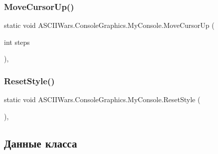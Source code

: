 \subsubsection{\texorpdfstring{Move\+Cursor\+Up()}{MoveCursorUp()}}
{\footnotesize\ttfamily static void A\+S\+C\+I\+I\+Wars.\+Console\+Graphics.\+My\+Console.\+Move\+Cursor\+Up (\begin{DoxyParamCaption}\item[{int}]{steps }\end{DoxyParamCaption})\hspace{0.3cm}{\ttfamily [inline]}, {\ttfamily [static]}}

\hypertarget{class_a_s_c_i_i_wars_1_1_console_graphics_1_1_my_console_aaf8beb7ac6983ccf63473d92398173a6}{}\label{class_a_s_c_i_i_wars_1_1_console_graphics_1_1_my_console_aaf8beb7ac6983ccf63473d92398173a6} 
\subsubsection{\texorpdfstring{Reset\+Style()}{ResetStyle()}}
{\footnotesize\ttfamily static void A\+S\+C\+I\+I\+Wars.\+Console\+Graphics.\+My\+Console.\+Reset\+Style (\begin{DoxyParamCaption}{ }\end{DoxyParamCaption})\hspace{0.3cm}{\ttfamily [inline]}, {\ttfamily [static]}}



\subsection{Данные класса}
\hypertarget{class_a_s_c_i_i_wars_1_1_console_graphics_1_1_my_console_a261e68f3fe9fa1ba12f21cb4e7a2e5f0}{}\label{class_a_s_c_i_i_wars_1_1_console_graphics_1_1_my_console_a261e68f3fe9fa1ba12f21cb4e7a2e5f0} 
